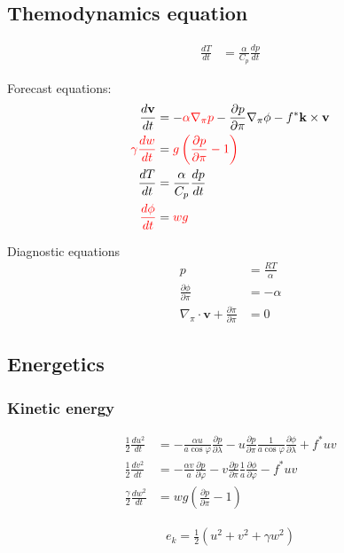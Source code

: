\documentclass[12pt]{article}
\renewcommand{\d}[2]{\frac{d #1}{d #2}}
\newcommand{\dt}[1]{\d{#1}{t}}
\newcommand{\pd}[2]{\frac{\partial #1}{\partial #2}}
\newcommand{\pdx}[2][1]{\frac{#1}{a \cos{\varphi}} \pd{#2}{\lambda}}
\newcommand{\pdy}[2][1]{\frac{#1}{a} \pd{#2}{\varphi}}
\renewcommand{\vec}[1]{\mathbf{#1}}
\newcommand{\grad}[2][\pi]{\nabla_{#1} #2}
\begin{document}
\subsection{Themodynamics equation}

\begin{align*}
  \dt{T} & =   \frac{\alpha}{C_p} \dt{p}
\end{align*}

Forecast equations:
\begin{align*}
  \dt{\vec{v}} & = - {\color{red}\alpha \grad{p}} - \pd{p}{\pi} \grad{\phi} - f^* \vec{k} \times \vec{v} \\
  {\color{red}\gamma \dt{w}} & = {\color{red}g \left(\pd{p}{\pi} - 1\right)} \\
  \dt{T} & = \frac{\alpha}{C_p} \dt{p} \\
  {\color{red}\dt{\phi}} & = {\color{red}w g}
\end{align*}

Diagnostic equations
\begin{align*}
  p & = \frac{R T}{\alpha} \\
  \pd{\phi}{\pi} & = - \alpha \\
  \nabla_\pi \cdot \vec{v} + \pd{\dot{\pi}}{\pi} & = 0
\end{align*}

\subsection{Energetics}

\subsubsection{Kinetic energy}

\begin{align*}
  \frac{1}{2}      \dt{u^2} & = - \pdx[\alpha u]{p} - u \pd{p}{\pi} \pdx{\phi} + f^* u v \\
  \frac{1}{2}      \dt{v^2} & = - \pdy[\alpha v]{p} - v \pd{p}{\pi} \pdy{\phi} - f^* u v \\
  \frac{\gamma}{2} \dt{w^2} & =   w g \left( \pd{p}{\pi} - 1 \right)
\end{align*}

\begin{align*}
  e_k = \frac{1}{2} \left(u^2 + v^2 + \gamma w^2\right)
\end{align*}
\end{document}

